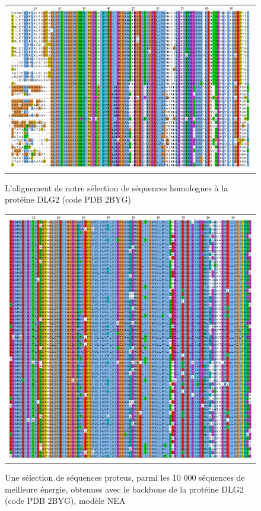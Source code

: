    \begin{figure}[t]
     \centering
     \begin{tabular}{c}
       \includegraphics[width=17cm]{homologues/2BYG.png} \\
     \end{tabular}
     \caption{L'alignement de notre sélection de séquences homologues à la protéine DLG2 (code PDB 2BYG)}
\label{align_homo:DLG2}
   \end{figure}

   \begin{figure}[t]
     \centering
     \begin{tabular}{c}
       \includegraphics[width=17cm]{proteus/2BYG.png} \\
     \end{tabular}
       \caption{Une sélection de séquences proteus, parmi les 10 000 séquences de meilleure énergie, obtenues avec le backbone de la protéine DLG2 (code PDB 2BYG), modèle NEA}
\label{align_proteus:DLG2}
   \end{figure}
\clearpage

